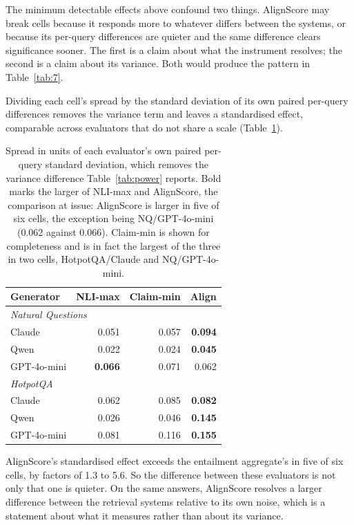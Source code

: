 \documentclass[11pt]{article}
\begin{document}
The minimum detectable effects above confound two things. AlignScore may break cells because it responds more to whatever differs between the systems, or because its per-query differences are quieter and the same difference clears significance sooner. The first is a claim about what the instrument resolves; the second is a claim about its variance. Both would produce the pattern in Table~\ref{tab:7}.

Dividing each cell's spread by the standard deviation of its own paired per-query differences removes the variance term and leaves a standardised effect, comparable across evaluators that do not share a scale (Table~\ref{tab:standardised}).

\begin{table}[t]
\centering\small
\begin{tabular}{lrrr}
\toprule
\textbf{Generator} & NLI-max & Claim-min & Align \\
\midrule
\multicolumn{4}{l}{\emph{Natural Questions}} \\
Claude & 0.051 & 0.057 & \textbf{0.094} \\
Qwen & 0.022 & 0.024 & \textbf{0.045} \\
GPT-4o-mini & \textbf{0.066} & 0.071 & 0.062 \\
\midrule
\multicolumn{4}{l}{\emph{HotpotQA}} \\
Claude & 0.062 & 0.085 & \textbf{0.082} \\
Qwen & 0.026 & 0.046 & \textbf{0.145} \\
GPT-4o-mini & 0.081 & 0.116 & \textbf{0.155} \\
\bottomrule
\end{tabular}
\caption{Spread in units of each evaluator's own paired per-query standard deviation, which removes the variance difference Table~\ref{tab:power} reports. Bold marks the larger of NLI-max and AlignScore, the comparison at issue: AlignScore is larger in five of six cells, the exception being NQ/GPT-4o-mini (0.062 against 0.066). Claim-min is shown for completeness and is in fact the largest of the three in two cells, HotpotQA/Claude and NQ/GPT-4o-mini.}
\label{tab:standardised}
\end{table}

AlignScore's standardised effect exceeds the entailment aggregate's in five of six cells, by factors of 1.3 to 5.6. So the difference between these evaluators is not only that one is quieter. On the same answers, AlignScore resolves a larger difference between the retrieval systems relative to its own noise, which is a statement about what it measures rather than about its variance.
\end{document}
